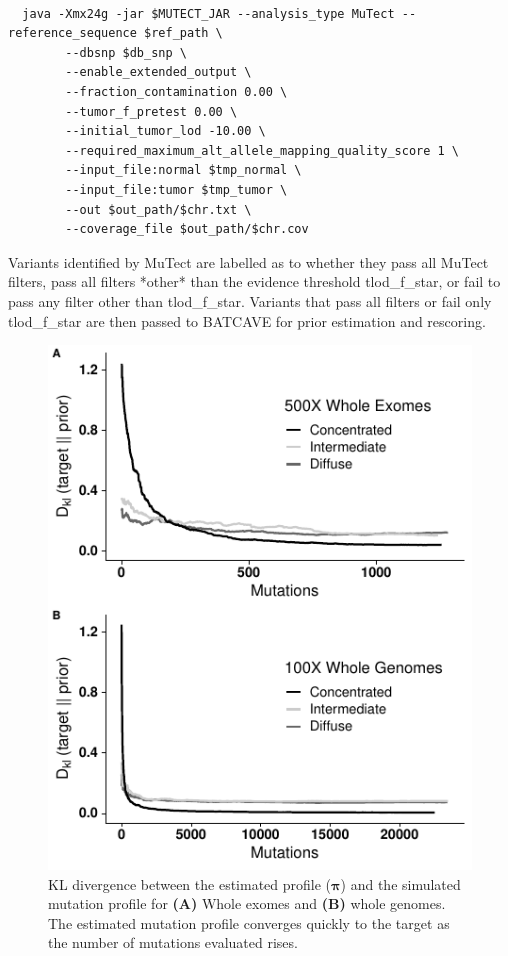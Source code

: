 \documentclass[a4,center,fleqn]{NAR}
\newcommand{\batcave}{BATCAVE }
\begin{document}
\begin{tiny}
\begin{verbatim}

  java -Xmx24g -jar $MUTECT_JAR --analysis_type MuTect --reference_sequence $ref_path \
        --dbsnp $db_snp \
        --enable_extended_output \
        --fraction_contamination 0.00 \
        --tumor_f_pretest 0.00 \
        --initial_tumor_lod -10.00 \
        --required_maximum_alt_allele_mapping_quality_score 1 \
        --input_file:normal $tmp_normal \
        --input_file:tumor $tmp_tumor \
        --out $out_path/$chr.txt \
        --coverage_file $out_path/$chr.cov

\end{verbatim}
\end{tiny}
Variants identified by MuTect are labelled as to whether they pass all MuTect filters, pass all filters *other* than the evidence threshold \textrm{tlod\_f\_star}, or fail to pass any filter other than \textrm{tlod\_f\_star}. 
Variants that pass all filters or fail only \textrm{tlod\_f\_star} are then passed to \batcave for prior estimation and rescoring.

\begin{figure}
  \begin{center}
  \includegraphics[width=.35\textwidth]{figures/kl_only.pdf}
  \end{center}
  \caption{KL divergence between the estimated profile ($\boldsymbol{\pi}$) and the simulated mutation profile for \textbf{(A)} Whole exomes and \textbf{(B)} whole genomes.
  The estimated mutation profile converges quickly to the target as the number of mutations evaluated rises.}
\label{NAR-kl_fig}
\end{figure}
\end{document}
